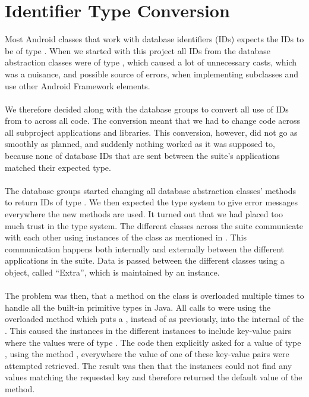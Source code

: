 \section{Identifier Type Conversion}
\label{sec:identifier_type_conversion}

Most Android classes that work with database identifiers (IDs) expects the IDs to be of type . When we started with this project all IDs from the database abstraction classes were of type , which caused a lot of unnecessary casts, which was a nuisance, and possible source of errors, when implementing  subclasses and use other Android Framework elements.
\\\\
We therefore decided along with the database groups to convert all use of IDs from  to  across all code. The conversion meant that we had to change code across all subproject applications and libraries. This conversion, however, did not go as smoothly as planned, and suddenly nothing worked as it was supposed to, because none of database IDs that are sent between the \giraf suite's applications matched their expected type.
\\\\
The database groups started changing all database abstraction classes'  methods to return IDs of type . We then expected the type system to give error messages everywhere the new  methods are used. It turned out that we had placed too much trust in the type system. The different  classes across the \giraf suite communicate with each other using instances of the  class as mentioned in . This communication happens both internally and externally between the different applications in the \giraf suite. Data is passed between the different  classes using a  object, called ``Extra'', which is maintained by an  instance.
\\\\
The problem was then, that a method  on the  class is overloaded multiple times to handle all the built-in primitive types in Java. All calls to  were using the overloaded method which puts a , instead of  as previously, into the internal  of the . This caused the  instances in the different  instances to include key-value pairs where the values were of type . The code then explicitly asked for a value of type , using the method , everywhere the value of one of these key-value pairs were attempted retrieved. The result was then that the  instances could not find any  values matching the requested key and therefore returned the default value of the  method.     
